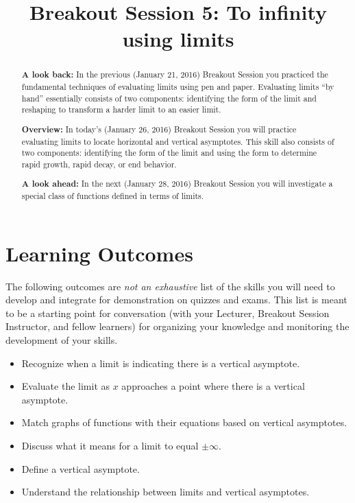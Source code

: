 \documentclass[handout,nooutcomes]{ximera}
\title{Breakout Session 5: To infinity using limits}
\begin{document}
\begin{abstract}
  \textbf{A look back:} In the previous (January 21, 2016) Breakout Session you practiced the fundamental techniques of evaluating limits using pen and paper.
  Evaluating limits ``by hand'' essentially consists of two components: identifying the form of the limit and reshaping to transform a harder limit to an easier limit.

  \textbf{Overview:} In today's (January 26, 2016) Breakout Session you will practice evaluating limits to locate horizontal and vertical asymptotes.
  This skill also consists of two components: identifying the form of the limit and using the form to determine rapid growth, rapid decay, or end behavior.

  \textbf{A look ahead:} In the next (January 28, 2016) Breakout Session you will investigate a special class of functions defined in terms of limits.
\end{abstract}
\maketitle

\section{Learning Outcomes}
\label{section:learning-outcomes}
The following outcomes are \emph{not an exhaustive} list of the skills you will need to develop and integrate for demonstration on quizzes and exams.
This list is meant to be a starting point for conversation (with your Lecturer, Breakout Session Instructor, and fellow learners) for organizing your knowledge and monitoring the development of your skills.

\begin{itemize}
  \item 
    Recognize when a limit is indicating there is a vertical asymptote.

  \item
    Evaluate the limit as $x$ approaches a point where there is a vertical asymptote.

  \item
    Match graphs of functions with their equations based on vertical asymptotes.

  \item  
    Discuss what it means for a limit to equal $\pm\infty$.

  \item 
    Define a vertical asymptote.

  \item
    Understand the relationship between limits and vertical asymptotes.
\end{itemize}
\end{document}
